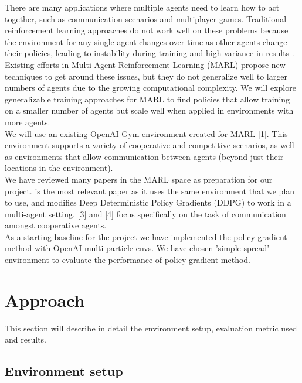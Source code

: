 \documentclass{article}
\begin{document}
There are many applications where multiple agents need to learn how to act together, such as communication scenarios and multiplayer games. Traditional reinforcement learning approaches do not work well on these problems because the environment for any single agent changes over time as other agents change their policies, leading to instability during training and high variance in results \cite{maddpg}. \\

Existing efforts in Multi-Agent Reinforcement Learning (MARL) propose new techniques to get around these issues, but they do not generalize well to larger numbers of agents due to the growing computational complexity.  We will explore generalizable training approaches for MARL to find policies that allow training on a smaller number of agents but scale well when applied in environments with more agents. \\

We will use an existing OpenAI Gym environment created for MARL [1]. This environment supports a variety of cooperative and competitive scenarios, as well as environments that allow communication between agents (beyond just their locations in the environment). \\

We have reviewed many papers in the MARL space as preparation for our project. \cite{maddpg} is the most relevant paper as it uses the same environment that we plan to use, and modifies Deep Deterministic Policy Gradients (DDPG) to work in a multi-agent setting. [3] and [4] focus specifically on the task of communication amongst cooperative agents. \\

As a starting baseline for the project we have implemented the policy gradient method with OpenAI multi-particle-envs. We have chosen 'simple-spread' environment to evaluate the performance of policy gradient method.


\section{Approach}

This section will describe in detail the environment setup, evaluation metric used and results.


\subsection{Environment setup}
\end{document}

